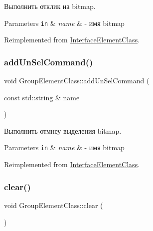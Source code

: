 Выполнить отклик на bitmap. 


\begin{DoxyParams}[1]{Parameters}
\mbox{\tt in}  & {\em name} & -\/ имя bitmap \\
\hline
\end{DoxyParams}


Reimplemented from \hyperlink{class_interface_element_class_a318c70a834096462e9ed764f32fe3065}{Interface\+Element\+Class}.

\mbox{\label{class_group_element_class_aa7a5120c46e4f73cbc818c2835b3e40a}} 
\subsubsection{\texorpdfstring{add\+Un\+Sel\+Command()}{addUnSelCommand()}}
{\footnotesize\ttfamily void Group\+Element\+Class\+::add\+Un\+Sel\+Command (\begin{DoxyParamCaption}\item[{const std\+::string \&}]{name }\end{DoxyParamCaption})\hspace{0.3cm}{\ttfamily [virtual]}}



Выполнить отмнеу выделения bitmap. 


\begin{DoxyParams}[1]{Parameters}
\mbox{\tt in}  & {\em name} & -\/ имя bitmap \\
\hline
\end{DoxyParams}


Reimplemented from \hyperlink{class_interface_element_class_a906729d7cf4a4db85520c8e516007685}{Interface\+Element\+Class}.

\mbox{\label{class_group_element_class_a162a930551375f92238a3d1604e05e6a}} 
\subsubsection{\texorpdfstring{clear()}{clear()}}
{\footnotesize\ttfamily void Group\+Element\+Class\+::clear (\begin{DoxyParamCaption}{ }\end{DoxyParamCaption})\hspace{0.3cm}{\ttfamily [virtual]}}



